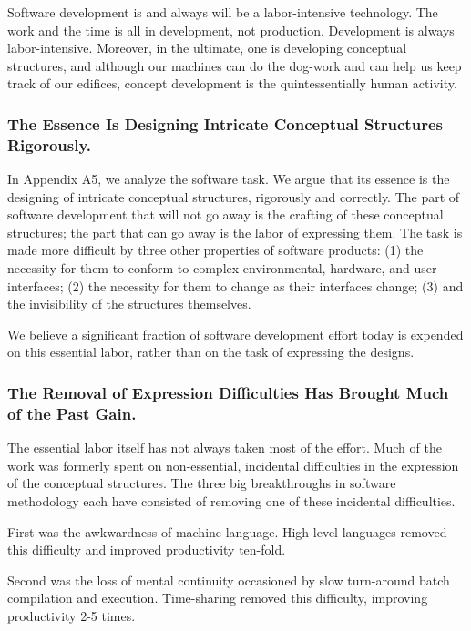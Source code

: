 \documentclass[12pt,final]{article}
\begin{document}
Software development is and always will be a labor-intensive technology. The
work and the time is all in development, not production. Development is always
labor-intensive.  Moreover, in the ultimate, one is developing conceptual
structures, and although our machines can do the dog-work and can help us keep
track of our edifices, concept development is the quintessentially human
activity.

\subsubsection*{The Essence Is Designing Intricate Conceptual Structures Rigorously.}

In Appendix A5, we analyze the software task. We argue that its essence is the
designing of intricate conceptual structures, rigorously and correctly. The
part of software development that will not go away is the crafting of these
conceptual structures; the part that can go away is the labor of expressing
them. The task is made more difficult by three other properties of software
products: (1) the necessity for them to conform to complex environmental,
hardware, and user interfaces; (2) the necessity for them to change as their
interfaces change; (3) and the invisibility of the structures themselves.

We believe a significant fraction of software development effort today is
expended on this essential labor, rather than on the task of expressing the
designs.

\subsubsection*{The Removal of Expression Difficulties Has Brought Much of the Past Gain.}

The essential labor itself has not always taken most of the effort. Much of the
work was formerly spent on non-essential, incidental difficulties in the
expression of the conceptual structures. The three big breakthroughs in
software methodology each have consisted of removing one of these incidental
difficulties.

First was the awkwardness of machine language. High-level languages removed
this difficulty and improved productivity ten-fold.

Second was the loss of mental continuity occasioned by slow turn-around batch
compilation and execution. Time-sharing removed this difficulty, improving
productivity 2-5 times.
\end{document}
